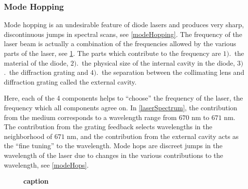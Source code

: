 \documentclass[12pt]{article}
\newcommand{\red}[1]{\textbf{\textcolor{myred1}{#1}}} %
\begin{document}
%	

	\subsubsection*{Mode Hopping}
	Mode hopping is an undesirable feature of diode lasers and produces very sharp, discontinuous jumps in spectral scans, see \cref{modeHopping}. The frequency of the laser beam is actually a combination of the frequencies allowed by the various parts of the laser, see \cref{LaserSpectrumCavity}. The parts which contribute to the frequency are $1)$.\ the material of the diode, $2)$.\ the physical size of the internal cavity in the diode, $3)$.\ the diffraction grating and $4)$.\ the separation between the collimating lens and diffraction grating called the external cavity.
	
	Here, each of the 4 components helps to ``choose'' the frequency of the laser, the frequency which all components agree on. In \cref{laserSpectrum}, the contribution from the medium corresponds to a wavelength range from $670$ nm to $671$ nm. The contribution from the grating feedback selects wavelengths in the neighborhood of $671$ nm, and the contribution from the external cavity acts as the ``fine tuning'' to the wavelength. Mode hops are discreet jumps in the wavelength of the laser due to changes in the various contributions to the wavelength, see \cref{modeHops}.
	
	\begin{figure}[H]
		\centering
		\qquad
		\caption{\red{caption}}
		\label{LaserSpectrumCavity}
	\end{figure}	
	
\end{document}
